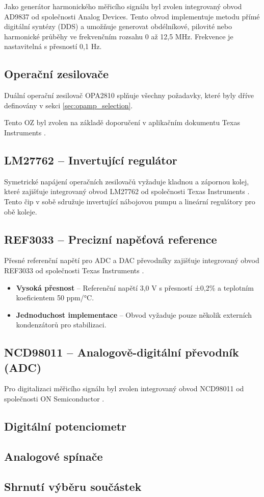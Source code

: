 Jako generátor harmonického měřicího signálu byl zvolen integrovaný obvod AD9837 od společnosti Analog Devices.
Tento obvod implementuje metodu přímé digitální syntézy (\acs{DDS}) a umožňuje generovat obdélníkové, pilovité nebo harmonické průběhy
ve frekvenčním rozsahu 0 až 12,5 MHz. Frekvence je nastavitelná s přesností 0,1 Hz.


\subsection{Operační zesilovače}

Duální operační zesilovač OPA2810 \cite{OPA2810} splňuje všechny požadavky, které byly dříve definovány v sekci \ref{sec:opamp_selection}.

Tento \acs{OZ} byl zvolen na základě doporučení v aplikačním dokumentu Texas Instruments \cite{TI_ImpedanceAppNote}.

\subsection{LM27762 -- Invertující regulátor}

Symetrické napájení operačních zesilovačů vyžaduje kladnou a zápornou kolej, které zajišťuje integrovaný obvod 
LM27762 od společnosti Texas Instruments \cite{LM27762}.
Tento čip v sobě sdružuje invertující nábojovou pumpu a lineární regulátory pro obě koleje.

\subsection{REF3033 -- Precizní napěťová reference}

Přesné referenční napětí pro \acs{ADC} a \acs{DAC} převodníky zajišťuje integrovaný obvod REF3033 od společnosti Texas Instruments \cite{REF3033}.

\begin{itemize}
    \item \textbf{Vysoká přesnost} -- Referenční napětí 3,0 V s přesností ±0,2\% a teplotním koeficientem 50 ppm/°C.
    \item \textbf{Jednoduchost implementace} -- Obvod vyžaduje pouze několik externích kondenzátorů pro stabilizaci.
\end{itemize}

\subsection{NCD98011 -- Analogově-digitální převodník (\acs{ADC})}

Pro digitalizaci měřicího signálu byl zvolen integrovaný obvod NCD98011 od společnosti ON Semiconductor \cite{NCD9801}.

\subsection{Digitální potenciometr}

\subsection{Analogové spínače}

\subsection{Shrnutí výběru součástek}
